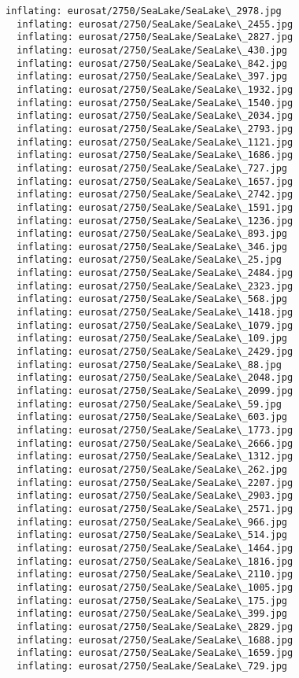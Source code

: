 \documentclass[11pt]{article}
\begin{document}
\begin{Verbatim}[commandchars=\\\{\}]
  inflating: eurosat/2750/SeaLake/SeaLake\_2978.jpg
  inflating: eurosat/2750/SeaLake/SeaLake\_2455.jpg
  inflating: eurosat/2750/SeaLake/SeaLake\_2827.jpg
  inflating: eurosat/2750/SeaLake/SeaLake\_430.jpg
  inflating: eurosat/2750/SeaLake/SeaLake\_842.jpg
  inflating: eurosat/2750/SeaLake/SeaLake\_397.jpg
  inflating: eurosat/2750/SeaLake/SeaLake\_1932.jpg
  inflating: eurosat/2750/SeaLake/SeaLake\_1540.jpg
  inflating: eurosat/2750/SeaLake/SeaLake\_2034.jpg
  inflating: eurosat/2750/SeaLake/SeaLake\_2793.jpg
  inflating: eurosat/2750/SeaLake/SeaLake\_1121.jpg
  inflating: eurosat/2750/SeaLake/SeaLake\_1686.jpg
  inflating: eurosat/2750/SeaLake/SeaLake\_727.jpg
  inflating: eurosat/2750/SeaLake/SeaLake\_1657.jpg
  inflating: eurosat/2750/SeaLake/SeaLake\_2742.jpg
  inflating: eurosat/2750/SeaLake/SeaLake\_1591.jpg
  inflating: eurosat/2750/SeaLake/SeaLake\_1236.jpg
  inflating: eurosat/2750/SeaLake/SeaLake\_893.jpg
  inflating: eurosat/2750/SeaLake/SeaLake\_346.jpg
  inflating: eurosat/2750/SeaLake/SeaLake\_25.jpg
  inflating: eurosat/2750/SeaLake/SeaLake\_2484.jpg
  inflating: eurosat/2750/SeaLake/SeaLake\_2323.jpg
  inflating: eurosat/2750/SeaLake/SeaLake\_568.jpg
  inflating: eurosat/2750/SeaLake/SeaLake\_1418.jpg
  inflating: eurosat/2750/SeaLake/SeaLake\_1079.jpg
  inflating: eurosat/2750/SeaLake/SeaLake\_109.jpg
  inflating: eurosat/2750/SeaLake/SeaLake\_2429.jpg
  inflating: eurosat/2750/SeaLake/SeaLake\_88.jpg
  inflating: eurosat/2750/SeaLake/SeaLake\_2048.jpg
  inflating: eurosat/2750/SeaLake/SeaLake\_2099.jpg
  inflating: eurosat/2750/SeaLake/SeaLake\_59.jpg
  inflating: eurosat/2750/SeaLake/SeaLake\_603.jpg
  inflating: eurosat/2750/SeaLake/SeaLake\_1773.jpg
  inflating: eurosat/2750/SeaLake/SeaLake\_2666.jpg
  inflating: eurosat/2750/SeaLake/SeaLake\_1312.jpg
  inflating: eurosat/2750/SeaLake/SeaLake\_262.jpg
  inflating: eurosat/2750/SeaLake/SeaLake\_2207.jpg
  inflating: eurosat/2750/SeaLake/SeaLake\_2903.jpg
  inflating: eurosat/2750/SeaLake/SeaLake\_2571.jpg
  inflating: eurosat/2750/SeaLake/SeaLake\_966.jpg
  inflating: eurosat/2750/SeaLake/SeaLake\_514.jpg
  inflating: eurosat/2750/SeaLake/SeaLake\_1464.jpg
  inflating: eurosat/2750/SeaLake/SeaLake\_1816.jpg
  inflating: eurosat/2750/SeaLake/SeaLake\_2110.jpg
  inflating: eurosat/2750/SeaLake/SeaLake\_1005.jpg
  inflating: eurosat/2750/SeaLake/SeaLake\_175.jpg
  inflating: eurosat/2750/SeaLake/SeaLake\_399.jpg
  inflating: eurosat/2750/SeaLake/SeaLake\_2829.jpg
  inflating: eurosat/2750/SeaLake/SeaLake\_1688.jpg
  inflating: eurosat/2750/SeaLake/SeaLake\_1659.jpg
  inflating: eurosat/2750/SeaLake/SeaLake\_729.jpg

\end{Verbatim}
\end{document}
